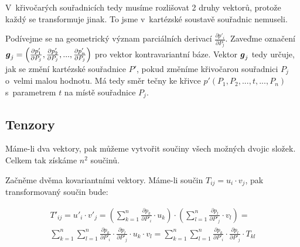 V~křivočarých souřadnicích tedy musíme rozlišovat 2 druhy vektorů, protože každý se transformuje jinak. To jsme v~kartézské soustavě souřadnic nemuseli.

Podívejme se na geometrický význam parciálních derivací \(\frac{\partial p'_i}{\partial P_j}\). Zaveďme označení \(\boldsymbol{g}_j = \left(\frac{\partial p'_1}{\partial P_j}, \frac{\partial p'_2}{\partial P_j}, ..., \frac{\partial p'_n}{\partial P_j}\right)\) pro vektor kontravariantní báze. Vektor \(\boldsymbol{g}_j\) tedy určuje, jak se změní kartézské souřadnice \(P'\), pokud změníme křivočarou souřadnici \(P_j\) o~velmi malou hodnotu. Má tedy směr tečny ke křivce \(p'(P_1, P_2, ..., t, ..., P_n)\) s~parametrem \(t\) na místě souřadnice \(P_j\).

 

\subsection{Tenzory}

Máme-li dva vektory, pak můžeme vytvořit součiny všech možných dvojic složek. Celkem tak získáme \(n^2\) součinů.

Začněme dvěma kovariantními vektory. Máme-li součin \(T_{ij} = u_i \cdot v_j\), pak transformovaný součin bude:

\begin{equation}
\label{eq:kovariantni_tenzor}
\begin{split}
T'_{ij} = u'_i \cdot v'_j = (\sum_{k=1}^n \frac{\partial p_k}{\partial P'_i} \cdot u_k) \cdot (\sum_{l=1}^n \frac{\partial p_l}{\partial P'_j} \cdot v_l) = \\
\sum_{k=1}^n \sum_{l=1}^n \frac{\partial p_k}{\partial P'_i} \cdot \frac{\partial p_l}{\partial P'_j} \cdot u_k \cdot v_l = \sum_{k=1}^n \sum_{l=1}^n \frac{\partial p_k}{\partial P'_i} \cdot \frac{\partial p_l}{\partial P'_j} \cdot T_{kl}
\end{split}
\end{equation}

